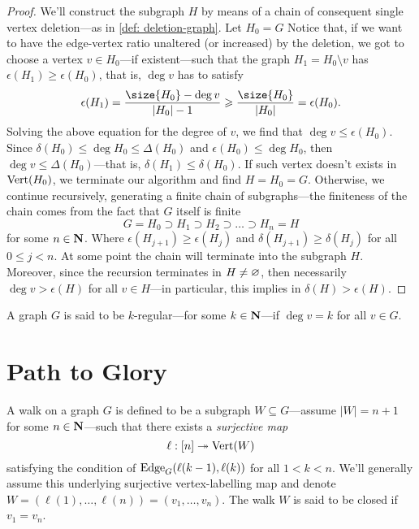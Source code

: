 \begin{proof}
    We'll construct the subgraph \(H\) by means of a chain of consequent single
    vertex deletion---as in \cref{def: deletion-graph}. Let \(H_0 = G\) Notice that,
    if we want to have the edge-vertex ratio unaltered (or increased) by the
    deletion, we got to choose a vertex \(v \in H_0\)---if existent---such that the
    graph \(H_1 = H_0 \setminus v\) has \(\epsilon(H_1) \geq \epsilon(H_0)\), that is, \(\deg v\) has to
    satisfy
    \[
        \epsilon(H_1) = \frac{\size{H_0} - \deg v}{|H_0| - 1}
        \geq \frac{\size{H_0}}{|H_0|} = \epsilon(H_0).
    \]
    Solving the above equation for the degree of \(v\), we find that
    \(\deg v \leq \epsilon(H_0)\). Since
    \(\delta(H_0) \leq \deg H_0 \leq \Delta(H_0)\) and
    \(\epsilon(H_0) \leq \deg H_0\), then \(\deg v \leq \Delta(H_0)\)---that is,
    \(\delta(H_1) \leq \delta(H_0)\). If such vertex doesn't exists in
    \(\operatorname{Vert}(H_0)\), we terminate our algorithm and find \(H = H_0 =
    G\). Otherwise, we continue recursively, generating a finite chain of
    subgraphs---the finiteness of the chain comes from the fact that \(G\) itself is
    finite
    \[
        G = H_0 \supset H_1 \supset H_2 \supset \dots \supset H_n = H
    \]
    for some \(n \in \mathbf{N}\). Where \(\epsilon(H_{j+1}) \geq \epsilon(H_j)\) and \(\delta(H_{j+1}) \geq \delta(H_j)\)
    for all \(0 \leq j < n\). At some point the chain will terminate into the subgraph
    \(H\). Moreover, since the recursion terminates in \(H \neq \varnothing\), then
    necessarily \(\deg v > \epsilon(H)\) for all \(v \in H\)---in particular, this implies in
    \(\delta(H) > \epsilon(H)\).
\end{proof}

\begin{definition}\label{def: k-regular}
    A graph \(G\) is said to be \(k\)-regular---for some \(k \in \mathbf{N}\)---if
    \(\deg v = k\) for all \(v \in G\).
\end{definition}

\section{Path to Glory}

\begin{definition}[Walk]\label{def: walk}
    A walk on a graph \(G\) is defined to be a subgraph \(W \subseteq G\)---assume \(|W| = n
    + 1\) for some \(n \in \mathbf{N}\)---such that there exists a \emph{surjective map}
    \[
        \ell: [n] \twoheadrightarrow \operatorname{Vert}(W)
    \]
    satisfying the condition of \(\operatorname{Edge}_G(\ell(k-1), \ell(k))\) for all \(1 < k <
    n\). We'll generally assume this underlying surjective vertex-labelling map and
    denote \(W = (\ell(1), \dots, \ell(n)) = (v_1, \dots, v_{n})\). The walk
    \(W\) is said to be closed if \(v_1 = v_{n}\).
\end{definition}


